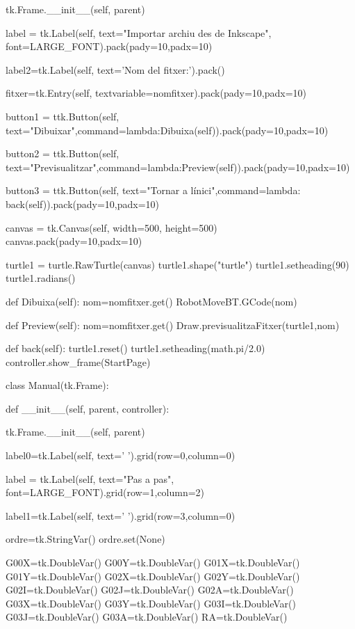 \begin{python}
		tk.Frame.__init__(self, parent)
		
		
		label = tk.Label(self, text="Importar archiu des de Inkscape", font=LARGE_FONT).pack(pady=10,padx=10)
		
		label2=tk.Label(self, text='Nom del fitxer:').pack()
		
		fitxer=tk.Entry(self, textvariable=nomfitxer).pack(pady=10,padx=10)
		
		button1 = ttk.Button(self, text="Dibuixar",command=lambda:Dibuixa(self)).pack(pady=10,padx=10)
		
		button2 = ttk.Button(self, text="Previsualitzar",command=lambda:Preview(self)).pack(pady=10,padx=10)
		
		button3 = ttk.Button(self, text="Tornar a l\'inici",command=lambda: back(self)).pack(pady=10,padx=10)
		
		canvas = tk.Canvas(self, width=500, height=500)
		canvas.pack(pady=10,padx=10)
		
		turtle1 = turtle.RawTurtle(canvas)
		turtle1.shape("turtle")
		turtle1.setheading(90)
		turtle1.radians()
		
		def Dibuixa(self):
			nom=nomfitxer.get()
			RobotMoveBT.GCode(nom)
		
		def Preview(self):
			nom=nomfitxer.get()
			Draw.previsualitzaFitxer(turtle1,nom)
		
		def back(self):
			turtle1.reset()
			turtle1.setheading(math.pi/2.0)
			controller.show_frame(StartPage)
	
	
	
	class Manual(tk.Frame):
	
		def __init__(self, parent, controller):
			
			tk.Frame.__init__(self, parent)
			
			label0=tk.Label(self, text='          ').grid(row=0,column=0)
			
			label = tk.Label(self, text="Pas a pas", font=LARGE_FONT).grid(row=1,column=2)
			
			label1=tk.Label(self, text='          ').grid(row=3,column=0)
			
			
			ordre=tk.StringVar()
			ordre.set(None)      
			
			G00X=tk.DoubleVar()
			G00Y=tk.DoubleVar()
			G01X=tk.DoubleVar()
			G01Y=tk.DoubleVar()
			G02X=tk.DoubleVar()
			G02Y=tk.DoubleVar()
			G02I=tk.DoubleVar()
			G02J=tk.DoubleVar()
			G02A=tk.DoubleVar()
			G03X=tk.DoubleVar()
			G03Y=tk.DoubleVar()
			G03I=tk.DoubleVar()
			G03J=tk.DoubleVar()
			G03A=tk.DoubleVar()
			RA=tk.DoubleVar()
			

\end{python}
